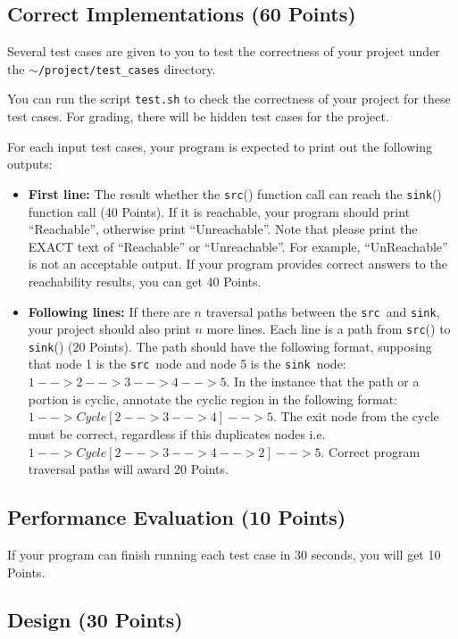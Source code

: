 \documentclass[12pt]{article}
\newcommand{\codeIn}[1]{{\small\tt{#1}}}
\newcommand{\src}{\codeIn{src}}
\newcommand{\sink}{\codeIn{sink}}
\begin{document}
\subsection{Correct Implementations (60 Points)}

Several test cases are given to you to test the correctness of your project under the \codeIn{$\sim$/project/test\_cases} directory.

You can run the script \codeIn{test.sh} to check the correctness of your
project for these test cases. For grading, there will be hidden test
cases for the project.

For each input test cases, your program is expected to print out the following outputs:
\begin{itemize}
    \item \textbf{First line:} The result whether the \src () function call can reach the \sink () function call (40 Points). If it is reachable, your program should print ``Reachable'', otherwise print  ``Unreachable''. Note that please print the EXACT text of ``Reachable'' or ``Unreachable''. For example, ``UnReachable'' is not an acceptable  output.  If your program provides correct answers to the reachability results, you can get 40 Points.
    \item \textbf{Following lines:} If there are $n$ traversal paths between the \src\  and \sink, your project should also print $n$ more lines. Each line 
    is a path from \src () to \sink () (20 Points). The path should have
    the following format, supposing that node 1 is the \src\  node and node 5 is the \sink\  node: \codeIn{$1-->2-->3-->4-->5$}. In the instance that the path or a portion is cyclic, annotate the cyclic region in the following format: \codeIn{$1-->Cycle[2-->3-->4]-->5$}. The exit node from the cycle must be correct, regardless if this duplicates nodes i.e. \codeIn{$1-->Cycle[2-->3-->4-->2]-->5$}. Correct program traversal paths will award 20 Points.
\end{itemize}

\subsection{Performance Evaluation (10 Points)}\label{sec:eval}
If your program can finish running each test case in 30 seconds, you will get 10 Points.

\subsection{Design (30 Points)}\label{sec:design}
\end{document}
